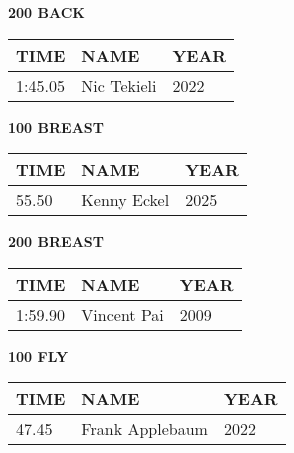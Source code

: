 \begin{minipage}[t]{0.48\textwidth}
\centering
\textbf{200 BACK}\\[0.05cm]
\begin{tabular}{@{}p{1.8cm}p{2.8cm}p{1.2cm}@{}}
\hline
\textbf{TIME} & \textbf{NAME} & \textbf{YEAR} \\
\hline
1:45.05 & Nic Tekieli & 2022 \\
\hline
\end{tabular}
\end{minipage}\hfill
\begin{minipage}[t]{0.48\textwidth}
\centering
\textbf{100 BREAST}\\[0.05cm]
\begin{tabular}{@{}p{1.8cm}p{2.8cm}p{1.2cm}@{}}
\hline
\textbf{TIME} & \textbf{NAME} & \textbf{YEAR} \\
\hline
55.50 & Kenny Eckel & 2025 \\
\hline
\end{tabular}
\end{minipage}

\vspace{0.4cm}

\begin{minipage}[t]{0.48\textwidth}
\centering
\textbf{200 BREAST}\\[0.05cm]
\begin{tabular}{@{}p{1.8cm}p{2.8cm}p{1.2cm}@{}}
\hline
\textbf{TIME} & \textbf{NAME} & \textbf{YEAR} \\
\hline
1:59.90 & Vincent Pai & 2009 \\
\hline
\end{tabular}
\end{minipage}\hfill
\begin{minipage}[t]{0.48\textwidth}
\centering
\textbf{100 FLY}\\[0.05cm]
\begin{tabular}{@{}p{1.8cm}p{2.8cm}p{1.2cm}@{}}
\hline
\textbf{TIME} & \textbf{NAME} & \textbf{YEAR} \\
\hline
47.45 & Frank Applebaum & 2022 \\
\hline
\end{tabular}
\end{minipage}

\vspace{0.4cm}

